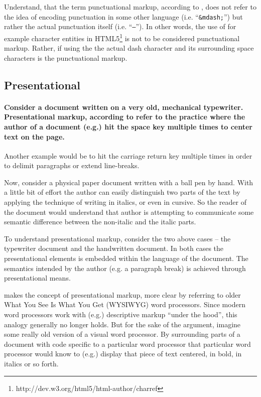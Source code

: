 \documentclass{scrreprt}
\begin{document}
Understand, that the term punctuational markup, according to \citet{coombs}, does not refer to the idea of encoding punctuation in some other language (i.e. ``\texttt{\&mdash;}'') but rather the actual punctuation itself (i.e. ``\texttt{--}''). In other words, the use of for example character entities in HTML5\footnote{http://dev.w3.org/html5/html-author/charref} is not to be considered punctuational markup. Rather, if using the the actual dash character and its surrounding space characters is the punctuational markup.




\subsection{Presentational}
\paragraph{Consider a document written on a very old, mechanical typewriter. Presentational markup, according to \citet{coombs} refer to the practice where the author of a document (e.g.) hit the space key multiple times to center text on the page.} Another example would be to hit the carriage return key multiple times in order to delimit paragraphs or extend line-breaks.

Now, consider a physical paper document written with a ball pen by hand. With a little bit of effort the author can easily distinguish two parts of the text by applying the technique of writing in italics, or even in cursive. So the reader of the document would understand that author is attempting to communicate some semantic difference between the non-italic and the italic parts.

To understand presentational markup, consider the two above cases -- the typewriter document and the handwritten document. In both cases the presentational elements is embedded within the language of the document. The semantics intended by the author (e.g. a paragraph break) is achieved through presentational means.

\citet{bray} makes the concept of presentational markup, more clear by referring to older What You See Is What You Get (WYSIWYG) word processors. Since modern word processors work with (e.g.) descriptive markup ``under the hood'', this analogy generally no longer holds. But for the sake of the argument, imagine some really old version of a visual word processor. By surrounding parts of a document with code specific to a particular word processor that particular word processor would know to (e.g.) display that piece of text centered, in bold, in italics or so forth.
\end{document}
